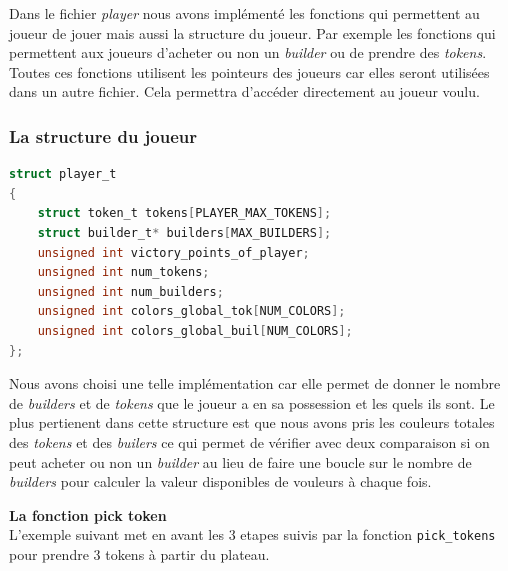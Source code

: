 \documentclass{article}
\begin{document}
\hspace{1em} Dans le fichier \emph{player} nous avons implémenté les fonctions qui permettent au joueur de jouer mais aussi la structure du joueur. Par exemple les fonctions qui permettent aux joueurs d'acheter ou non un \emph{builder} ou de prendre des \emph{tokens}. Toutes ces fonctions utilisent les pointeurs des joueurs car elles seront utilisées dans un autre fichier. Cela permettra d'accéder directement au joueur voulu.\\

\subsubsection{La structure du joueur}
\begin{tcolorbox}[colback=gray!10,colframe=white!75!black]
\begin{lstlisting}[language=C, caption={La structure caracterisant un joueur}, label={lst:exemple10-c}]
struct player_t 
{
    struct token_t tokens[PLAYER_MAX_TOKENS];
    struct builder_t* builders[MAX_BUILDERS];
    unsigned int victory_points_of_player;
    unsigned int num_tokens;
    unsigned int num_builders;
    unsigned int colors_global_tok[NUM_COLORS];
    unsigned int colors_global_buil[NUM_COLORS];
};
\end{lstlisting}
\end{tcolorbox}

\vspace{1em}
\hspace{1em} Nous avons choisi une telle implémentation car elle permet de donner le nombre de \emph{builders} et de \emph{tokens} que le joueur a en sa possession et les quels ils sont. Le plus pertienent dans cette structure est que nous avons pris les couleurs totales des \emph{tokens} et des \emph{builers} ce qui permet de vérifier avec deux comparaison si on peut acheter ou non un \emph{builder} au lieu de faire une boucle sur le nombre de \emph{builders} pour calculer la valeur disponibles de vouleurs à chaque fois. 

\textbf{La fonction pick token} \\
\vspace{1em }
\hspace{1em} L'exemple suivant met en avant les 3 etapes suivis par la fonction \texttt{pick\_tokens} pour prendre 3 tokens à partir du plateau.
\end{document}
